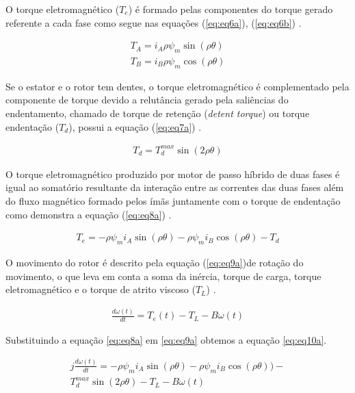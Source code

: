 O torque eletromagnético ($T_e$) é formado pelas componentes do torque gerado referente a cada fase como segue nas equações (\ref{eq:eq6a}), (\ref{eq:eq6b}) \cite{stepersimulink}.

\begin{eqnarray}
\label{eq:eq6a}
T_A = i_A \rho \psi_m \sin(\rho \theta)\\
\label{eq:eq6b}
T_B = i_B \rho \psi_m \cos(\rho \theta) 
\end{eqnarray}

Se o estator e o rotor tem dentes, o torque eletromagnético é complementado pela componente de torque devido a relutância gerado pela saliências do endentamento, chamado de torque de retenção (\textit{detent torque}) ou torque endentação ($T_d$), possui a equação (\ref{eq:eq7a}) \cite{kenjo}.

\begin{eqnarray}
\label{eq:eq7a}
T_d = T_{d}^{max}\sin(2 \rho \theta)
\end{eqnarray}

O torque eletromagnético produzido por motor de passo híbrido de duas fases é igual ao somatório resultante da interação entre as correntes das duas fases além do fluxo magnético formado pelos ímãs juntamente com o torque de endentação como demonstra a equação (\ref{eq:eq8a}) \cite{mathworkmotor}.

\begin{eqnarray}
	\label{eq:eq8a}
	T_e = - \rho \psi_m i_A \sin(\rho \theta) - \rho \psi_m i_B \cos(\rho \theta ) - T_d
\end{eqnarray}

O movimento do rotor é descrito pela equação (\ref{eq:eq9a})de rotação do movimento, o que leva em conta a soma da inércia, torque de carga, torque eletromagnético e o torque de atrito viscoso ($T_L$)\cite{stepersimulink} .

\begin{eqnarray}
\label{eq:eq9a}
\frac{d\omega(t)}{dt} = T_e(t) - T_L - B\omega(t)
\end{eqnarray}

Substituindo a equação \ref{eq:eq8a} em \ref{eq:eq9a} obtemos a equação \ref{eq:eq10a}.


\begin{eqnarray}
\label{eq:eq10a}
j\frac{d\omega(t)}{dt} = - \rho \psi_m i_A \sin(\rho \theta) - \rho \psi_m i_B \cos(\rho \theta ) )-\\ \nonumber T_{d}^{max}\sin(2 \rho \theta)  - T_L - B\omega(t)
\end{eqnarray}


